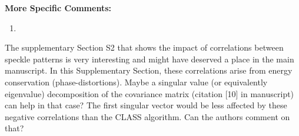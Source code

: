\documentclass[12pt]{article}
\newenvironment{solved_reviewercomment}
    {\begin{tcolorbox}[width=\linewidth,colback=gray!5,colframe=solved_commentcolor!50,title=Reviewer Comment,left=5pt,right=5pt]}
    {\end{tcolorbox}}
\begin{document}
\textbf{More Specific Comments:}

\begin{enumerate}[label=\arabic*., resume]
\item \leavevmode
\end{enumerate}
\vspace{-1em}
\begin{solved_reviewercomment}
    The supplementary Section S2 that shows the impact of correlations between speckle patterns is very interesting and might have deserved a place in the main manuscript. In this Supplementary Section, these correlations arise from energy conservation (phase-distortions). Maybe a singular value (or equivalently eigenvalue) decomposition of the covariance matrix \cite{badon2020distortion}(citation [10] in manuscript) can help in that case? The first singular vector would be less affected by these negative correlations than the CLASS algorithm. Can the authors comment on that? 
\end{solved_reviewercomment}
\end{document}
